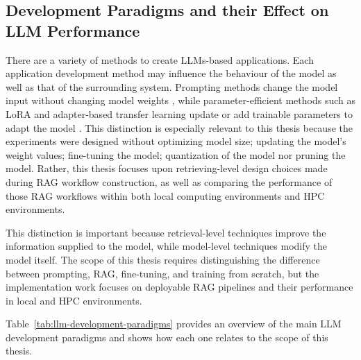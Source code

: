 \subsection{Development Paradigms and their Effect on LLM Performance}

There are a variety of methods to create \acp{LLM}-based applications. Each application development method may influence the behaviour of the model as well as that of the surrounding system. Prompting methods change the model input without changing model weights \cite{liu2023pretrain}, while parameter-efficient methods such as \ac{LoRA} and adapter-based transfer learning update or add trainable parameters to adapt the model \cite{hu2022lora,pfeiffer2021adapterfusion}. This distinction is especially relevant to this thesis because the experiments were designed without optimizing model size; updating the model's weight values; fine-tuning the model; quantization of the model nor pruning the model. Rather, this thesis focuses upon retrieving-level design choices made during \ac{RAG} workflow construction, as well as comparing the performance of those \ac{RAG} workflows within both local computing environments and \ac{HPC} environments.

This distinction is important because retrieval-level techniques improve the information supplied to the model, while model-level techniques modify the model itself. The scope of this thesis requires distinguishing the difference between prompting, \ac{RAG}, fine-tuning, and training from scratch, but the implementation work focuses on deployable \ac{RAG} pipelines and their performance in local and \ac{HPC} environments.

Table~\ref{tab:llm-development-paradigms} provides an overview of the main LLM development paradigms and shows how each one relates to the scope of this thesis.

